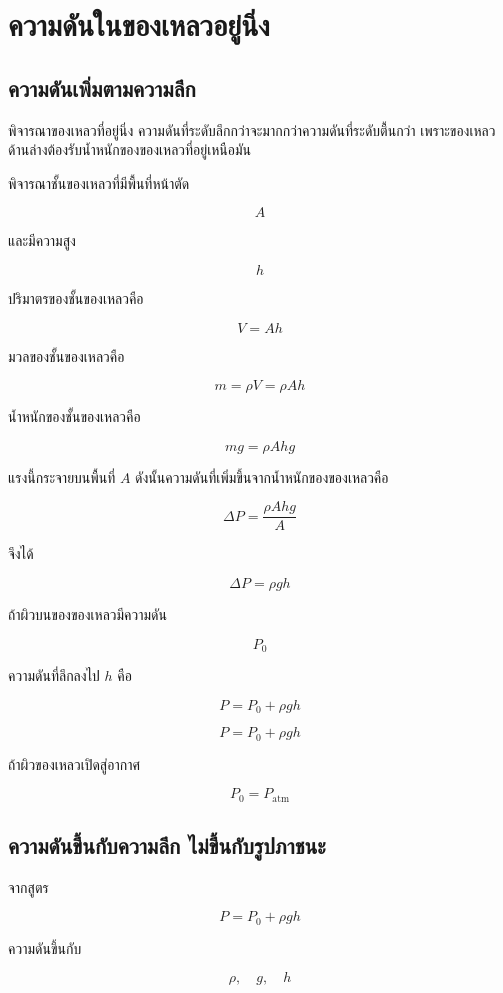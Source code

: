 \section{ความดันในของเหลวอยู่นิ่ง}

\subsection{ความดันเพิ่มตามความลึก}

พิจารณาของเหลวที่อยู่นิ่ง ความดันที่ระดับลึกกว่าจะมากกว่าความดันที่ระดับตื้นกว่า เพราะของเหลวด้านล่างต้องรับน้ำหนักของของเหลวที่อยู่เหนือมัน

พิจารณาชั้นของเหลวที่มีพื้นที่หน้าตัด

\[
A
\]

และมีความสูง

\[
h
\]

ปริมาตรของชั้นของเหลวคือ

\[
V=Ah
\]

มวลของชั้นของเหลวคือ

\[
m=\rho V=\rho Ah
\]

น้ำหนักของชั้นของเหลวคือ

\[
mg=\rho Ahg
\]

แรงนี้กระจายบนพื้นที่ $A$ ดังนั้นความดันที่เพิ่มขึ้นจากน้ำหนักของของเหลวคือ

\[
\Delta P=\frac{\rho Ahg}{A}
\]

จึงได้

\[
\Delta P=\rho gh
\]

ถ้าผิวบนของของเหลวมีความดัน

\[
P_0
\]

ความดันที่ลึกลงไป $h$ คือ

\[
P=P_0+\rho gh
\]

\begin{tcolorbox}[title=ความดันในของเหลวอยู่นิ่ง]
\[
P=P_0+\rho gh
\]

ถ้าผิวของเหลวเปิดสู่อากาศ

\[
P_0=P_{\text{atm}}
\]
\end{tcolorbox}

\subsection{ความดันขึ้นกับความลึก ไม่ขึ้นกับรูปภาชนะ}

จากสูตร

\[
P=P_0+\rho gh
\]

ความดันขึ้นกับ

\[
\rho,\quad g,\quad h
\]


